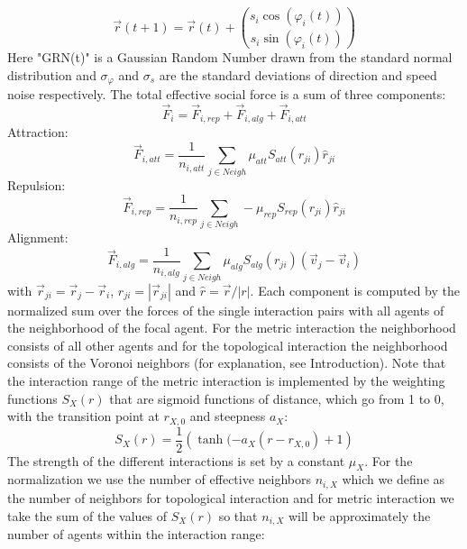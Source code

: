 \documentclass[a4paper,10pt,hidelinks]{scrreprt}
\begin{document}
	\begin{equation}
		\vec{r}(t+1) = \vec{r}(t) + {s_i\cos(\varphi_i(t)) \choose s_i\sin(\varphi_i(t)) }
		\label{eq:r_update}
	\end{equation}
	Here "GRN(t)" is a Gaussian Random Number drawn from the standard normal distribution and $\sigma_\varphi$ and $\sigma_s$ are the standard deviations of direction and speed noise respectively.
	The total effective social force is a sum of three components:
	\begin{equation}
		\vec{F}_i=\vec{F}_{i,rep}+\vec{F}_{i,alg}+\vec{F}_{i,att}
		\label{eq:forces}
	\end{equation}
	Attraction:
	\begin{equation}
		\vec{F}_{i,att}= \frac{1}{n_{i,att}}\sum_{j \in Neigh} \mu_{att}S_{att}({r}_{ji}) \hat{r}_{ji}
		\label{eq:att}
	\end{equation}
	Repulsion:
	\begin{equation}
		\vec{F}_{i,rep}=\frac{1}{n_{i,rep}}\sum_{j \in Neigh} -\mu_{rep}S_{rep}({r}_{ji}) \hat{r}_{ji}
		\label{eq:rep}
	\end{equation}
	Alignment:
	\begin{equation}
		\vec{F}_{i,alg}=\frac{1}{n_{i,alg}}\sum_{j \in Neigh} \mu_{alg}S_{alg}({r}_{ji}) (\vec{v}_j-\vec{v}_i)
		\label{eq:alg}
	\end{equation}
	with $\vec{r}_{ji} = \vec{r}_j - \vec{r}_i$, $r_{ji} = |\vec{r}_{ji}|$ and $\hat r = \vec{r}/|r|$.
	Each component is computed by the normalized sum over the forces of the single interaction pairs with all agents of the neighborhood of the focal agent.
	For the metric interaction the neighborhood consists of all other agents and for the topological interaction the neighborhood consists of the Voronoi neighbors (for explanation, see Introduction).
	Note that the interaction range of the metric interaction is implemented by the weighting functions $S_X(r)$ that are sigmoid functions of distance, which go from 1 to 0, with the transition point at $r_{X,0}$ and steepness $a_{X}$:
	\begin{equation}
	S_X(r)=\frac{1}{2}\left(\tanh(-a_{X}(r-r_{X,0})+1\right)
	\label{eq:sigm}
	\end{equation}
	The strength of the different interactions is set by a constant $\mu_X$.
	For the normalization we use the number of effective neighbors $n_{i,X}$ which we define as the number of neighbors for topological interaction and for metric interaction we take the sum of the values of $S_X(r)$ so that $n_{i,X}$ will be approximately the number of agents within the interaction range:
\end{document}
